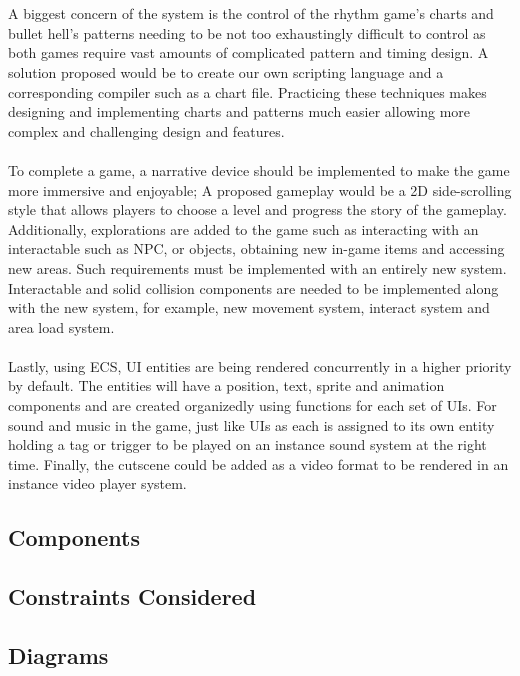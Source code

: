 \\\\
A biggest concern of the system is the control of the rhythm game’s charts and bullet hell’s patterns
needing to be not too exhaustingly difficult to control as both games require vast amounts of complicated pattern and timing design.
A solution proposed would be to create our own scripting language and a corresponding compiler such as a chart file.
Practicing these techniques makes designing and implementing charts and patterns much easier
allowing more complex and challenging design and features.
\\\\
To complete a game, a narrative device should be implemented to make the game more immersive and enjoyable;
A proposed gameplay would be a 2D side-scrolling style that allows players to choose a level and progress the story of the gameplay.
Additionally, explorations are added to the game such as interacting with an interactable such as NPC, or objects, obtaining new in-game items and accessing new areas.
Such requirements must be implemented with an entirely new system.
Interactable and solid collision components are needed to be implemented along with the new system, for example, new movement system, interact system and area load system.
\\\\
Lastly, using ECS, UI entities are being rendered concurrently in a higher priority by default.
The entities will have a position, text, sprite and animation components and are created organizedly using functions for each set of UIs.
For sound and music in the game, just like UIs as each is assigned to its own entity holding a tag or trigger to be played on an instance sound system at the right time.
Finally, the cutscene could be added as a video format to be rendered in an instance video player system.



\subsection{Components}
\label{subsec:components}

\subsection{Constraints Considered}
\label{subsec:constraints-considered}

\subsection{Diagrams}
\label{subsec:diagrams}

